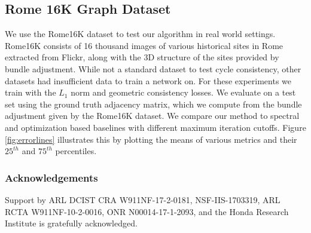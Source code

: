 \documentclass[10pt,twocolumn,letterpaper]{article}
\begin{document}
\subsection{Rome 16K Graph Dataset}
We  use the Rome16K dataset \cite{li2010location} to test our algorithm in real world settings.
Rome16K consists of 16 thousand images of various historical sites in Rome extracted from Flickr, along with the 3D structure of the sites provided by bundle adjustment.
While not a standard dataset to test cycle consistency, other datasets had insufficient data to train a network on.
For these experiments we train with the $L_1$ norm and geometric consistency losses.
We evaluate on a test set using the ground truth adjacency matrix, which we compute from the bundle adjustment given by the Rome16K dataset.
We compare our method to spectral and optimization based baselines with different maximum iteration cutoffs.
Figure \ref{fig:errorlines} illustrates this by plotting the means of various metrics and their $25^{th}$ and $75^{th}$ percentiles.



\subsubsection*{Acknowledgements}
Support by ARL DCIST CRA W911NF-17-2-0181, NSF-IIS-1703319, ARL RCTA W911NF-10-2-0016, ONR N00014-17-1-2093, and the Honda Research Institute is gratefully acknowledged.

{\small


}
\end{document}
